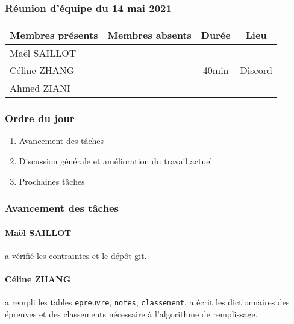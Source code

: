 


% 
\subsubsection*{\large{Réunion d'équipe du 14 mai 2021}}
\begin{center}
\begin{tabular}{| l | l || c | c |}
    \hline
    Membres présents & Membres absents & Durée & Lieu \\
    \hline
    Maël SAILLOT & & & \\ Céline ZHANG & & 40min & Discord \\ Ahmed ZIANI & & & \\
    \hline
\end{tabular}
\end{center}

\subsubsection*{Ordre du jour}
\begin{enumerate}
    \item Avancement des tâches
    \item Discussion générale et amélioration du travail actuel
    \item Prochaines tâches
\end{enumerate}

\subsubsection*{Avancement des tâches}
\paragraph{Maël SAILLOT} a vérifié les contraintes et le dépôt \textsf{git}.
\paragraph{Céline ZHANG} a rempli les tables \texttt{epreuvre}, \texttt{notes}, \texttt{classement}, a écrit les dictionnaires des épreuves et des classements nécessaire à l'algorithme de remplissage.
